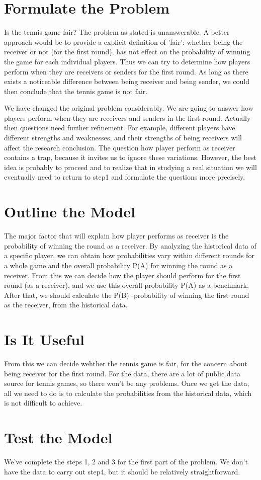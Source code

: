 \documentclass[12pt,letterpaper]{article}
\theoremstyle{definition}
\begin{document}
\section{Formulate the Problem} 
Is the tennis game fair? The problem as stated is unanswerable. A better approach would be to provide a explicit definition of 'fair': whether being the receiver or not (for the first round), has not effect on the probability of winning the game for each individual players. Thus we can try to determine how players perform when they are receivers or senders for the first round. As long as there exists a noticeable difference between being receiver and being sender, we could then conclude that the tennis game is not fair.

We have changed the original problem considerably. We are going to answer how players perform when they are receivers and senders in the first round. Actually then questions need further refinement. For example, different players have different strengths and weaknesses, and their strengths of being receivers will affect the research conclusion. The question how player perform as receiver contains a trap, because it invites us to ignore these variations. However, the best idea is probably to proceed and to realize that in studying a real situation we will eventually need to return to step1 and formulate the questions more precisely.

\section{Outline the Model}
The major factor that will explain how player performs as receiver is the probability of winning the round as a receiver. By analyzing the historical data of a specific player, we can obtain how probabilities vary within different rounds for a whole game and the overall probability P(A) for winning the round as a receiver. From this we can decide how the player should perform for the first round (as a receiver), and we use this overall probability P(A) as a benchmark. After that, we should calculate the P(B) -probability of winning the first round as the receiver, from the historical data. 
  
\section{Is It Useful}
From this we can decide wehther the tennis game is fair, for the concern about being receiver for the first round. For the data, there are a lot of public data source for tennis games, so there won't be any problems. Once we get the data, all we need to do is to calculate the probabilities from the historical data, which is not difficult to achieve. 

\section{Test the Model}
We've complete the steps 1, 2 and 3 for the first part of the problem. We don't have the data to carry out step4, but it should be relatively straightforward.
\end{document}
